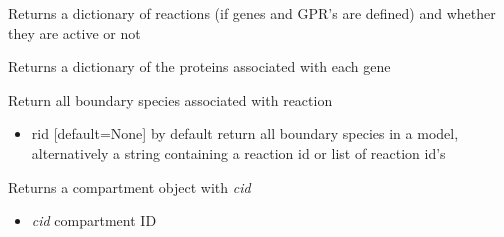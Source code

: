 \documentclass[a4paper,11pt,english]{sphinxmanual}
\begin{document}
\begin{fulllineitems}
\begin{fulllineitems}
\end{fulllineitems}


\begin{fulllineitems}
\label{modules_doc:cbmpy.CBModel.Model.getAllProteinActivities}
Returns a dictionary of reactions (if genes and GPR's are defined) and whether they are active or not

\end{fulllineitems}


\begin{fulllineitems}
\label{modules_doc:cbmpy.CBModel.Model.getAllProteinGeneAssociations}
Returns a dictionary of the proteins associated with each gene

\end{fulllineitems}


\begin{fulllineitems}
\label{modules_doc:cbmpy.CBModel.Model.getBoundarySpeciesIds}
Return all boundary species associated with reaction
\begin{itemize}
\item {} 
rid {[}default=None{]} by default return all boundary species in a model, alternatively a string containing a reaction id or list of reaction id's

\end{itemize}

\end{fulllineitems}


\begin{fulllineitems}
\label{modules_doc:cbmpy.CBModel.Model.getCompartment}
Returns a compartment object with \emph{cid}
\begin{itemize}
\item {} 
\emph{cid} compartment ID

\end{itemize}


\end{fulllineitems}
\end{fulllineitems}
\end{document}

